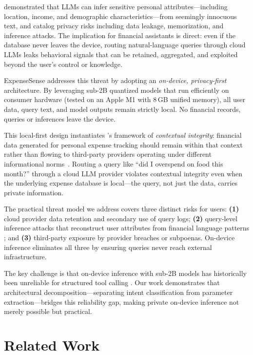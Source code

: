 \documentclass[11pt,twocolumn]{article}
\begin{document}
\citet{staab2024memorization} demonstrated that LLMs can infer
sensitive personal attributes---including location, income, and
demographic characteristics---from seemingly innocuous text, and
\citet{yao2024survey} catalog privacy risks including data leakage,
memorization, and inference attacks.
The implication for financial assistants is direct: even if the
database never leaves the device, routing natural-language queries
through cloud LLMs leaks behavioral signals that can be retained,
aggregated, and exploited beyond the user's control or knowledge.

ExpenseSense addresses this threat by adopting an \emph{on-device,
privacy-first} architecture.
By leveraging sub-2B quantized models that run efficiently on consumer
hardware (tested on an Apple M1 with 8\,GB unified memory), all user
data, query text, and model outputs remain strictly local.
No financial records, queries or inferences leave the device.

This local-first design instantiates \citeauthor{nissenbaum2004privacy}'s
framework of \emph{contextual integrity}: financial data generated for
personal expense tracking should remain within that context rather
than flowing to third-party providers operating under different
informational norms~\citep{nissenbaum2004privacy}.
Routing a query like ``did I overspend on food this month?'' through a
cloud LLM provider violates contextual integrity even when the
underlying expense database is local---the query, not just the data,
carries private information.

The practical threat model we address covers three distinct risks for
users:
\textbf{(1)} cloud provider data retention and secondary use of query
logs;
\textbf{(2)} query-level inference attacks that reconstruct user
attributes from financial language patterns \citep{staab2024memorization};
and
\textbf{(3)} third-party exposure by provider breaches or subpoenas.
On-device inference eliminates all three by ensuring queries never
reach external infrastructure.

The key challenge is that on-device inference with sub-2B models has
historically been unreliable for structured tool calling
\citep{kavathekar2025small}.
Our work demonstrates that architectural decomposition---separating
intent classification from parameter extraction---bridges this
reliability gap, making private on-device inference not merely
possible but practical.

\section{Related Work}
\end{document}
